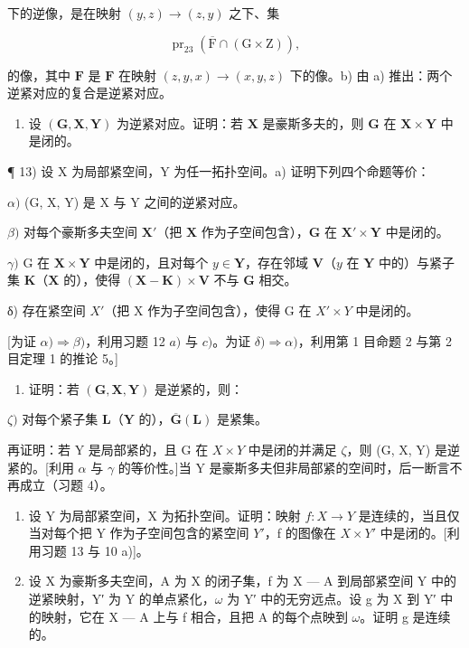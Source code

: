 下的逆像，是在映射 \((y, z) \to (z, y)\) 之下、集

\[
\operatorname{pr} _ {2 3} (\overline {{{\mathrm{F}}}} \cap (\mathrm{G} \times \mathrm{Z})),
\]

的像，其中 \(\mathbf{F}\) 是 \(\mathbf{F}\) 在映射 \((z, y, x) \to (x, y, z)\) 下的像。b) 由 a) 推出：两个逆紧对应的复合是逆紧对应。

\begin{enumerate}
\def\labelenumi{\alph{enumi})}
\setcounter{enumi}{2}
\tightlist
\item
  设 \((\mathbf{G},\mathbf{X},\mathbf{Y})\) 为逆紧对应。证明：若 \(\mathbf{X}\) 是豪斯多夫的，则 \(\mathbf{G}\) 在 \(\mathbf{X} \times \mathbf{Y}\) 中是闭的。
\end{enumerate}

¶ 13) 设 X 为局部紧空间，Y 为任一拓扑空间。a) 证明下列四个命题等价：

\(\alpha)\) (G, X, Y) 是 X 与 Y 之间的逆紧对应。

\(\beta)\) 对每个豪斯多夫空间 \(\mathbf{X}'\)（把 \(\mathbf{X}\) 作为子空间包含），\(\mathbf{G}\) 在 \(\mathbf{X}' \times \mathbf{Y}\) 中是闭的。

\(\gamma)\) G 在 \(\mathbf{X} \times \mathbf{Y}\) 中是闭的，且对每个 \(y \in \mathbf{Y}\)，存在邻域 \(\mathbf{V}\)（\(y\) 在 \(\mathbf{Y}\) 中的）与紧子集 \(\mathbf{K}\)（\(\mathbf{X}\) 的），使得 \((\mathbf{X} - \mathbf{K}) \times \mathbf{V}\) 不与 \(\mathbf{G}\) 相交。

δ) 存在紧空间 \(X'\)（把 X 作为子空间包含），使得 G 在 \(X' \times Y\) 中是闭的。

{[}为证 \(\alpha) \Longrightarrow \beta)\)，利用习题 12 \(a)\) 与 \(c)\)。为证 \(\delta) \Longrightarrow \alpha)\)，利用第 1 目命题 2 与第 2 目定理 1 的推论 5。{]}

\begin{enumerate}
\def\labelenumi{\alph{enumi})}
\setcounter{enumi}{1}
\tightlist
\item
  证明：若 \((\mathbf{G},\mathbf{X},\mathbf{Y})\) 是逆紧的，则：
\end{enumerate}

\(\zeta)\) 对每个紧子集 \(\mathbf{L}\)（\(\mathbf{Y}\) 的），\(\overline{\mathbf{G}}(\mathbf{L})\) 是紧集。

再证明：若 Y 是局部紧的，且 G 在 \(X \times Y\) 中是闭的并满足 \(\zeta\)，则 (G, X, Y) 是逆紧的。{[}利用 \(\alpha\) 与 \(\gamma\) 的等价性。{]}当 Y 是豪斯多夫但非局部紧的空间时，后一断言不再成立（习题 4）。

\begin{enumerate}
\def\labelenumi{\arabic{enumi})}
\setcounter{enumi}{13}
\item
  设 Y 为局部紧空间，X 为拓扑空间。证明：映射 \(f: X \rightarrow Y\) 是连续的，当且仅当对每个把 Y 作为子空间包含的紧空间 \(Y'\)，f 的图像在 \(X \times Y'\) 中是闭的。{[}利用习题 13 与 10 a){]}。
\item
  设 X 为豪斯多夫空间，A 为 X 的闭子集，f 为 X --- A 到局部紧空间 Y 中的逆紧映射，Y′ 为 Y 的单点紧化，\(\omega\) 为 Y′ 中的无穷远点。设 g 为 X 到 Y′ 中的映射，它在 X --- A 上与 f 相合，且把 A 的每个点映到 \(\omega\)。证明 g 是连续的。
\end{enumerate}


